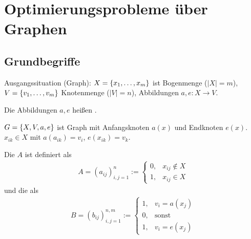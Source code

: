 \section{Optimierungsprobleme über Graphen}
\subsection{Grundbegriffe}
Ausgangssituation (Graph):
$X = \set{x_1, \dots, x_m}$ ist Bogenmenge ($|X| = m$), 
$V = \set{v_1, \dots, v_m}$ Knotenmenge ($|V| = n$), 
Abbildungen $a, e:X \rightarrow V$.
\begin{definition}
  Die Abbildungen $a, e$ heißen .

$G = \set{X, V, a, e}$ ist Graph mit Anfangsknoten $a(x)$ und Endknoten $e(x)$. 
$x_{ik} \in X$ mit $a(a_{ik}) = v_i$, $e(x_{ik}) = v_k$. 
\end{definition}

\begin{definition}
  Die  $A$ ist definiert als
\begin{align*}
  A =(a_{ij})_{i, j = 1}^n :=
  \begin{cases}
    0, &x_{ij} \notin X \\
    1, &x_{ij} \in X 
  \end{cases}
\end{align*}
und die  als
\begin{align*}
  B=(b_{ij})_{i, j = 1}^{n, m} :=
  \begin{cases}
    1, &v_i = a(x_j)\\
    0, & \text{sonst}\\
    1, &v_i = e(x_j)
  \end{cases}
\end{align*}

\end{definition}